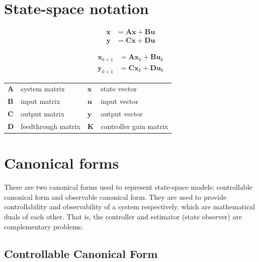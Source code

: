 \documentclass[10pt,conference,compsoc]{IEEEtran}
\newcommand{\mtx}[1] {\bm #1}
\begin{document}
\section{State-space notation}

\begin{align}
  \dot{\mtx{x}} &= \mtx{A}\mtx{x} + \mtx{B}\mtx{u} \label{eq:s_ctrl_x} \\
  \mtx{y} &= \mtx{C}\mtx{x} + \mtx{D}\mtx{u} \label{eq:s_ctrl_y}
\end{align}

\begin{align}
  \mtx{x}_{k+1} &= \mtx{A}\mtx{x}_k + \mtx{B}\mtx{u}_k \label{eq:z_ctrl_x} \\
  \mtx{y}_{k+1} &= \mtx{C}\mtx{x}_k + \mtx{D}\mtx{u}_k \label{eq:z_ctrl_y}
\end{align}

\begin{table}[ht]
  \renewcommand{\arraystretch}{1.3}
  \centering
  \begin{tabulary}{\linewidth}{LLLL}
    $\mtx{A}$ & system matrix      & $\mtx{x}$ & state vector \\
    $\mtx{B}$ & input matrix       & $\mtx{u}$ & input vector \\
    $\mtx{C}$ & output matrix      & $\mtx{y}$ & output vector \\
    $\mtx{D}$ & feedthrough matrix & $\mtx{K}$ & controller gain matrix \\
  \end{tabulary}
  \label{tab:ctrl_def}
\end{table}

\section{Canonical forms}

\noindent There are two canonical forms used to represent state-space models:
controllable canonical form and observable canonical form. They are used to
provide controllability and observability of a system respectively, which are
mathematical duals of each other. That is, the controller and estimator (state
observer) are complementary problems. \\

\subsection{Controllable Canonical Form} \label{subsec:ctrl_canon}
\end{document}
